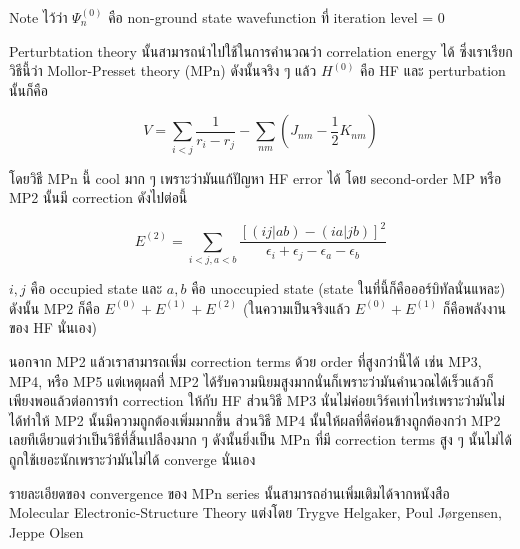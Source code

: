 Note ไว้ว่า $\Psi^{(0)}_{n}$ คือ non-ground state wavefunction ที่ iteration level = 0

Perturbtation theory นั้นสามารถนำไปใช้ในการคำนวณว่า correlation energy ได้ ซึ่งเราเรียกวิธีนี้ว่า
Mollor-Presset theory (MPn) ดังนั้นจริง ๆ แล้ว $H^{(0)}$ คือ HF และ perturbation นั้นก็คือ

\begin{equation}
    V = \sum_{i < j} \frac{1}{r_{i} - r_{j}} - \sum_{nm} (J_{nm} - \frac{1}{2}K_{nm})
\end{equation}

โดยวิธี MPn นี้ cool มาก ๆ เพราะว่ามันแก้ปัญหา HF error ได้ โดย second-order MP หรือ MP2 นั้นมี
correction ดังไปต่อนี้

\begin{equation}
    E^{(2)} = \sum_{i<j,a<b} \frac{[(ij|ab) - (ia|jb)]^{2}}
    {\epsilon_{i} + \epsilon_{j} - \epsilon_{a} - \epsilon_{b}}
\end{equation}

\noindent $i,j$ คือ occupied state และ $a,b$ คือ unoccupied state (state ในที่นี้ก็คือออร์บิทัลนั่นแหละ)
ดังนั้น MP2 ก็คือ $E^{(0)} + E^{(1)} + E^{(2)}$ (ในความเป็นจริงแล้ว $E^{(0)} + E^{(1)}$ ก็คือพลังงานของ
HF นั่นเอง)

นอกจาก MP2 แล้วเราสามารถเพิ่ม correction terms ด้วย order ที่สูงกว่านี้ได้ เช่น MP3, MP4, หรือ MP5
แต่เหตุผลที่ MP2 ได้รับความนิยมสูงมากนั่นก็เพราะว่ามันคำนวณได้เร็วแล้วก็เพียงพอแล้วต่อการทำ correction
ให้กับ HF ส่วนวิธี MP3 นั่นไม่ค่อยเวิร์คเท่าไหร่เพราะว่ามันไม่ได้ทำให้ MP2 นั้นมีความถูกต้องเพิ่มมากขึ้น ส่วนวิธี MP4 
นั้นให้ผลที่ดีค่อนข้างถูกต้องกว่า MP2 เลยทีเดียวแต่ว่าเป็นวิธีที่สิ้นเปลืองมาก ๆ ดังนั้นยิ่งเป็น MPn ที่มี correction terms 
สูง ๆ นั้นไม่ได้ถูกใช้เยอะนักเพราะว่ามันไม่ได้ converge นั่นเอง 

รายละเอียดของ convergence ของ MPn series นั้นสามารถอ่านเพิ่มเติมได้จากหนังสือ 
Molecular Electronic-Structure Theory แต่งโดย Trygve Helgaker, Poul Jørgensen, Jeppe Olsen

